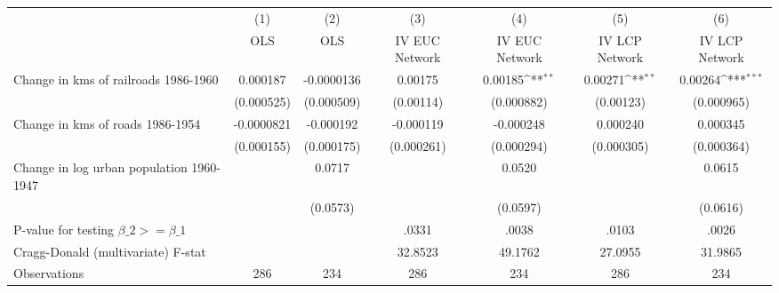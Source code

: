 {
\def\sym#1{\ifmmode^{#1}\else\(^{#1}\)\fi}
\begin{tabular}{l*{6}{c}}
\hline\hline
                &\multicolumn{1}{c}{(1)}&\multicolumn{1}{c}{(2)}&\multicolumn{1}{c}{(3)}&\multicolumn{1}{c}{(4)}&\multicolumn{1}{c}{(5)}&\multicolumn{1}{c}{(6)}\\
                &\multicolumn{1}{c}{OLS}&\multicolumn{1}{c}{OLS}&\multicolumn{1}{c}{IV EUC Network}&\multicolumn{1}{c}{IV EUC Network}&\multicolumn{1}{c}{IV LCP Network}&\multicolumn{1}{c}{IV LCP Network}\\
\hline
Change in kms of railroads 1986-1960& 0.000187         &-0.0000136         &  0.00175         &  0.00185\sym{**} &  0.00271\sym{**} &  0.00264\sym{***}\\
                &(0.000525)         &(0.000509)         &(0.00114)         &(0.000882)         &(0.00123)         &(0.000965)         \\
[1em]
Change in kms of roads 1986-1954&-0.0000821         &-0.000192         &-0.000119         &-0.000248         & 0.000240         & 0.000345         \\
                &(0.000155)         &(0.000175)         &(0.000261)         &(0.000294)         &(0.000305)         &(0.000364)         \\
[1em]
Change in log urban population 1960-1947&                  &   0.0717         &                  &   0.0520         &                  &   0.0615         \\
                &                  & (0.0573)         &                  & (0.0597)         &                  & (0.0616)         \\
\hline
P-value for testing $\beta\_{2} >= \beta\_{1}$&                  &                  &    .0331         &    .0038         &    .0103         &    .0026         \\
Cragg-Donald (multivariate) F-stat&                  &                  &  32.8523         &  49.1762         &  27.0955         &  31.9865         \\
Observations    &      286         &      234         &      286         &      234         &      286         &      234         \\
\hline\hline
\end{tabular}
}

